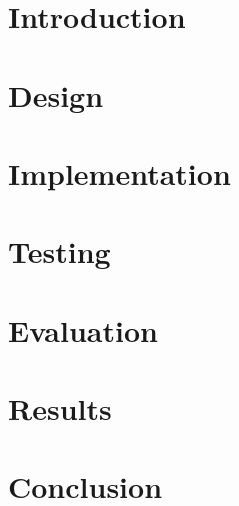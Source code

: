 \documentclass[
	fontsize=11pt,
	parskip=half
]{scrreprt}
\begin{document}
	
	

	\newpage
	\tableofcontents
	\newpage
	
	\chapter{Introduction} {
	\label{ch:introduction}
		
	}
	
	\chapter{Design} {
	\label{ch:design}
			
	}
	
	\chapter{Implementation} {
	\label{ch:implementation}
		
	}

	\chapter{Testing} {
	\label{ch:testing}
		
	}

	\chapter{Evaluation} {
	\label{ch:evaluation}
		
	}

	\chapter{Results} {
	\label{ch:results}
		
	}

	\chapter{Conclusion} {
	\label{ch:conclusion}
		
	}
	
	\renewcommand{\bibname}{References}
	\printbibliography[notcategory=exclude]
	
\end{document}
